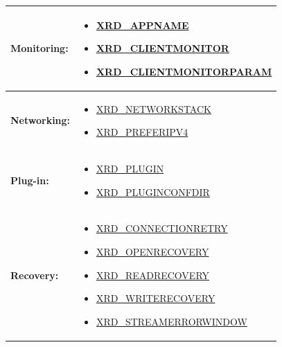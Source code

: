 \documentclass{article}
\begin{document}
\begin{center}
\begin{longtable}{ | l | p{} | }
		     {\footnotesize \textbf{Monitoring:}} & \begin{scriptsize} 
		     \begin{itemize}
		       \item \hyperref[env:appname]{XRD_APPNAME}
		       \item \hyperref[env:clientmonitor]{XRD_CLIENTMONITOR}
		       \item \hyperref[env:clientmonitorparam]{XRD_CLIENTMONITORPARAM}
		     \end{itemize}
		     \end{scriptsize} \\
		     \hline
		     
		     {\footnotesize \textbf{Networking:}} & \begin{scriptsize} 
		     \begin{itemize}
		       \item \hyperref[env:networkstack]{XRD_NETWORKSTACK}
		       \item \hyperref[env:preferipv4]{XRD_PREFERIPV4}
		     \end{itemize} 
		     \end{scriptsize} \\
		     \hline
		     
		     {\footnotesize \textbf{Plug-in:}} & \begin{scriptsize}
		     \begin{itemize}
		       \item \hyperref[env:plugin]{XRD_PLUGIN}
		       \item \hyperref[env:pluginconfigdir]{XRD_PLUGINCONFDIR}
		     \end{itemize} 
		     \end{scriptsize} \\
		     \hline
		     
		     {\footnotesize \textbf{Recovery:}} & \begin{scriptsize} 
		     \begin{itemize}
		       \item \hyperref[env:connectionretry]{XRD_CONNECTIONRETRY}
		       \item \hyperref[env:openrecovery]{XRD_OPENRECOVERY}
		       \item \hyperref[env:readrecovery]{XRD_READRECOVERY}
		       \item \hyperref[env:writerecovery]{XRD_WRITERECOVERY}
		       \item \hyperref[env:streamerrorwindow]{XRD_STREAMERRORWINDOW}
		     \end{itemize} 
		     \end{scriptsize} \\
		     \hline
		     

\end{longtable}
\end{center}
\end{document}

